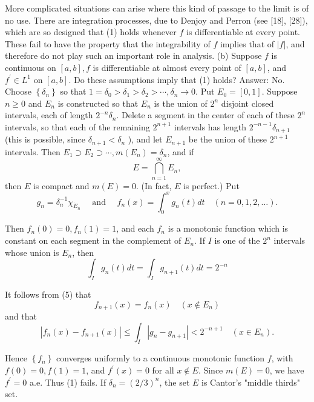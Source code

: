 More complicated situations can arise where this kind of passage to the limit is of no use. There are integration processes, due to Denjoy and Perron (see [18], [28]), which are so designed that (1) holds whenever $f$ is differentiable at every point. These fail to have the property that the integrability of $f$ implies that of $|f|$, and therefore do not play such an important role in analysis.
(b) Suppose $f$ is continuous on $[a, b], f$ is differentiable at almost every point of $[a, b]$, and $f^{\prime} \in L^1$ on $[a, b]$. Do these assumptions imply that (1) holds?
Answer: No.
Choose $\left\{\delta_n\right\}$ so that $1=\delta_0>\delta_1>\delta_2>\cdots, \delta_n \rightarrow 0$. Put $E_0=[0,1]$. Suppose $n \geq 0$ and $E_n$ is constructed so that $E_n$ is the union of $2^n$ disjoint closed intervals, each of length $2^{-n} \delta_n$. Delete a segment in the center of each of these $2^n$ intervals, so that each of the remaining $2^{n+1}$ intervals has length $2^{-n-1} \delta_{n+1}$ (this is possible, since $\delta_{n+1}<\delta_n$ ), and let $E_{n+1}$ be the union of these $2^{n+1}$ intervals. Then $E_1 \supset E_2 \supset \cdots, m\left(E_n\right)=\delta_n$, and if
$$
E=\bigcap_{n=1}^{\infty} E_n,
$$
then $E$ is compact and $m(E)=0$. (In fact, $E$ is perfect.) Put
$$
g_n=\delta_n^{-1} \chi_{\dot{E}_n} \quad \text { and } \quad f_n(x)=\int_0^x g_n(t) d t \quad(n=0,1,2, \ldots) .
$$

Then $f_n(0)=0, f_n(1)=1$, and each $f_n$ is a monotonic function which is constant on each segment in the complement of $E_n$. If $I$ is one of the $2^n$ intervals whose union is $E_n$, then
$$
\int_I g_n(t) d t=\int_I g_{n+1}(t) d t=2^{-n}
$$

It follows from (5) that
$$
f_{n+1}(x)=f_n(x) \quad\left(x \notin E_n\right)
$$
and that
$$
\left|f_n(x)-f_{n+1}(x)\right| \leq \int_I\left|g_n-g_{n+1}\right|<2^{-n+1} \quad\left(x \in E_n\right) .
$$

Hence $\left\{f_n\right\}$ converges uniformly to a continuous monotonic function $f$, with $f(0)=0, f(1)=1$, and $f^{\prime}(x)=0$ for all $x \notin E$. Since $m(E)=0$, we have $f^{\prime}=0$ a.e.
Thus (1) fails.
If $\delta_n=(2 / 3)^n$, the set $E$ is Cantor's "middle thirds" set.

